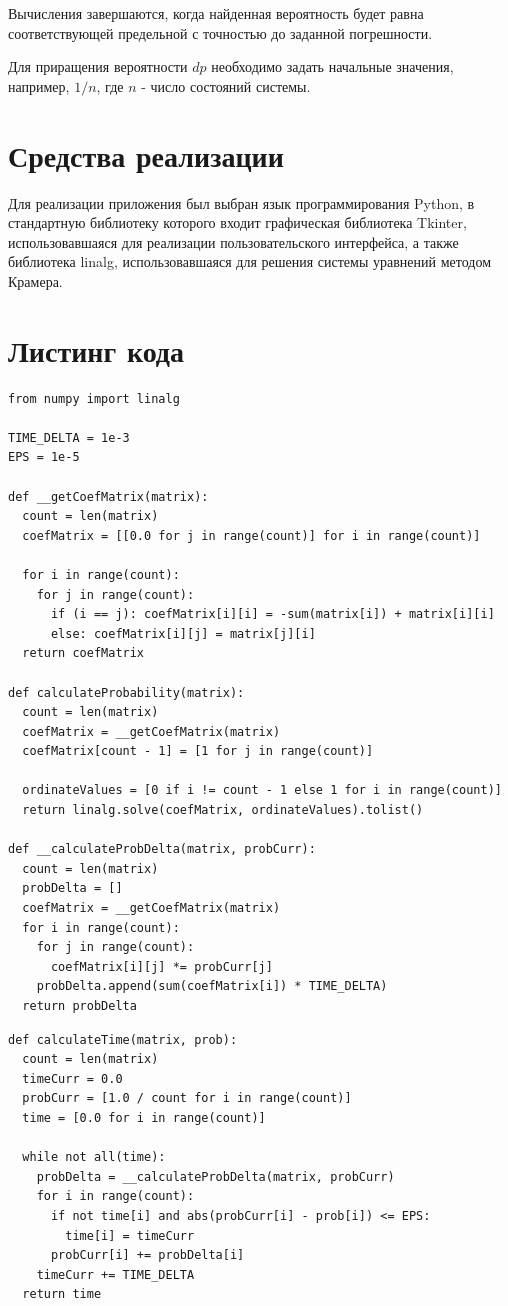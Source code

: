\documentclass[12pt]{report}
\begin{document}
Вычисления завершаются, когда найденная вероятность будет равна соответствующей предельной с точностью до заданной погрешности.
\newline


Для приращения вероятности $dp$ необходимо задать начальные значения, например, $1/n$, где $n$ - число состояний системы.

\section*{Средства реализации}

Для реализации приложения был выбран язык программирования Python, в стандартную библиотеку которого входит графическая библиотека Tkinter, использовавшаяся для реализации пользовательского интерфейса, а также библиотека linalg, использовавшаяся для решения системы уравнений методом Крамера.

\section*{Листинг кода}

\begin{lstlisting}
from numpy import linalg

TIME_DELTA = 1e-3
EPS = 1e-5

def __getCoefMatrix(matrix):
  count = len(matrix)
  coefMatrix = [[0.0 for j in range(count)] for i in range(count)]

  for i in range(count):
    for j in range(count):
      if (i == j): coefMatrix[i][i] = -sum(matrix[i]) + matrix[i][i] 
      else: coefMatrix[i][j] = matrix[j][i]
  return coefMatrix

def calculateProbability(matrix):
  count = len(matrix)
  coefMatrix = __getCoefMatrix(matrix)
  coefMatrix[count - 1] = [1 for j in range(count)]

  ordinateValues = [0 if i != count - 1 else 1 for i in range(count)]
  return linalg.solve(coefMatrix, ordinateValues).tolist()

def __calculateProbDelta(matrix, probCurr):
  count = len(matrix)
  probDelta = []
  coefMatrix = __getCoefMatrix(matrix)
  for i in range(count):
    for j in range(count):
      coefMatrix[i][j] *= probCurr[j]
    probDelta.append(sum(coefMatrix[i]) * TIME_DELTA)
  return probDelta
\end{lstlisting}
\clearpage
\begin{lstlisting}
def calculateTime(matrix, prob):
  count = len(matrix)
  timeCurr = 0.0
  probCurr = [1.0 / count for i in range(count)]
  time = [0.0 for i in range(count)]
  
  while not all(time):
    probDelta = __calculateProbDelta(matrix, probCurr)
    for i in range(count):
      if not time[i] and abs(probCurr[i] - prob[i]) <= EPS:
        time[i] = timeCurr
      probCurr[i] += probDelta[i]
    timeCurr += TIME_DELTA
  return time
\end{lstlisting}
\end{document}
